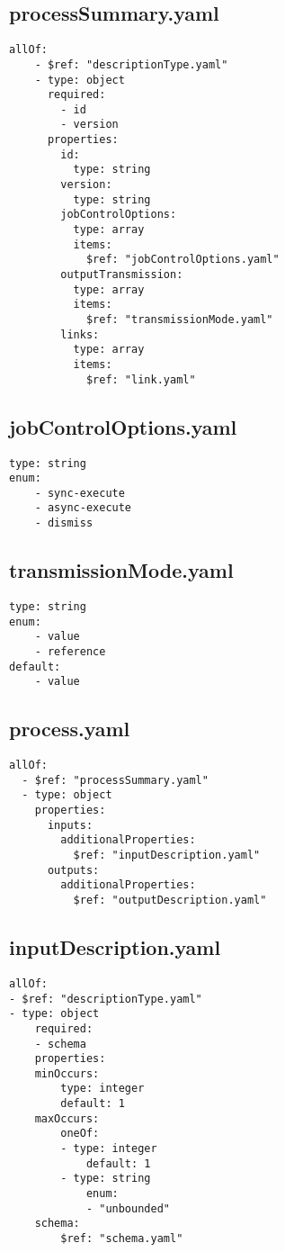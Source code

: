 \subsection{processSummary.yaml}
\begin{lstlisting}[caption={processSummary.yaml}, style = JSON]
allOf:
    - $ref: "descriptionType.yaml"
    - type: object
      required:
        - id
        - version
      properties:
        id:
          type: string
        version:
          type: string
        jobControlOptions:
          type: array
          items:
            $ref: "jobControlOptions.yaml"
        outputTransmission:
          type: array
          items:
            $ref: "transmissionMode.yaml"
        links:
          type: array
          items:
            $ref: "link.yaml"
\end{lstlisting}\label{SchemaProcessSummaryyaml} 

\subsection{jobControlOptions.yaml}
\begin{lstlisting}[caption={jobControlOptions.yaml}, style = JSON]
type: string
enum:
    - sync-execute
    - async-execute
    - dismiss
\end{lstlisting}\label{SchemaJobControlOptionsyaml} 

\subsection{transmissionMode.yaml}
\begin{lstlisting}[caption={transmissionMode.yaml}, style = JSON]
type: string
enum:
    - value
    - reference
default:
    - value
\end{lstlisting}\label{SchemaTransmissionModeyaml} 

\subsection{process.yaml}
\begin{lstlisting}[caption={process.yaml}, style = JSON]
allOf:
  - $ref: "processSummary.yaml"
  - type: object
    properties:
      inputs:
        additionalProperties:
          $ref: "inputDescription.yaml"
      outputs:
        additionalProperties:
          $ref: "outputDescription.yaml"
\end{lstlisting}\label{SchemaProcessyaml} 

\subsection{inputDescription.yaml}
\begin{lstlisting}[caption={inputDescription.yaml}, style = JSON]
allOf:
- $ref: "descriptionType.yaml"
- type: object
    required:
    - schema
    properties:
    minOccurs:
        type: integer
        default: 1
    maxOccurs:
        oneOf:
        - type: integer
            default: 1
        - type: string
            enum:
            - "unbounded"
    schema:
        $ref: "schema.yaml"
\end{lstlisting}\label{SchemaInputDescriptionyaml} 

